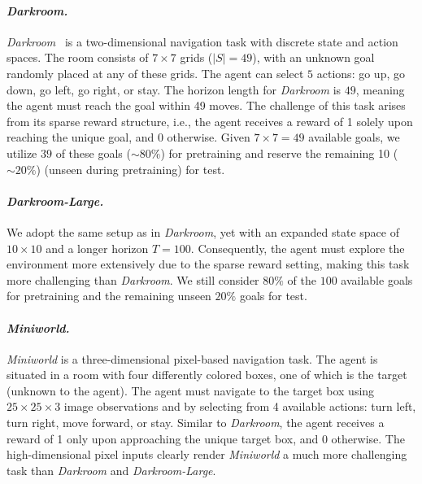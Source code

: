 \paragraph{\textit{Darkroom.}}
%
\textit{Darkroom}~\citep{laskin2022context, zintgraf2019varibad} is a two-dimensional navigation task with discrete state and action spaces. The room consists of $7 \times 7$ grids ($|S| = 49$), with an unknown goal randomly placed at any of these grids. The agent can select $5$ actions: go up, go down, go left, go right, or stay. The horizon length for \textit{Darkroom} is $49$, meaning the agent must reach the goal within 49 moves. The challenge of this task arises from its sparse reward structure, i.e., the agent receives a reward of 1 solely upon reaching the unique goal, and $0$ otherwise. 
%
Given $7 \times 7 = 49$ available goals, we utilize $39$ of these goals ($\sim 80\%$) for pretraining and reserve the remaining 10 ($\sim 20\%$) (unseen during pretraining) for test.


\paragraph{\textit{Darkroom-Large.}}
%
We adopt the same setup as in \textit{Darkroom}, yet with an expanded state space of $10 \times 10$ and a longer horizon $T=100$. Consequently, the agent must explore the environment more extensively due to the sparse reward setting, making this task more challenging than \textit{Darkroom}. We still consider $80\%$ of the $100$ available goals for pretraining and the remaining unseen $20\%$ goals for test.



\paragraph{\textit{Miniworld.}}
%
\textit{Miniworld} is a three-dimensional pixel-based navigation task. The agent is situated in a room with four differently colored boxes, one of which is the target (unknown to the agent). The agent must navigate to the target box using $25 \times 25 \times 3$ image observations and by selecting from 4 available actions: turn left, turn right, move forward, or stay. Similar to \textit{Darkroom}, the agent receives a reward of 1 only upon approaching the unique target box, and 0 otherwise. The high-dimensional pixel inputs clearly render \textit{Miniworld} a much more challenging task than \textit{Darkroom} and \textit{Darkroom-Large}.






